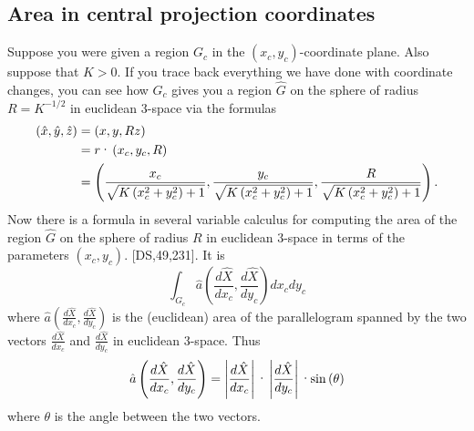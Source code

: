 \subsection*{Area in central projection coordinates}

Suppose you were given a region $G_{c}$ in the $\left(  x_{c},y_{c}\right)
$-coordinate plane. Also suppose that $K>0$. If you trace back everything we
have done with coordinate changes, you can see how $G_{c}$ gives you a region
$\hat{G}$ on the sphere of radius $R=K^{-1/2}$ in euclidean $3$-space via the
formulas%
\begin{align*}
\left(  \hat{x},\hat{y},\hat{z}\right)   &  =\left(  x,y,Rz\right) \\
&  =r\text{\textperiodcentered}\left(  x_{c},y_{c},R\right) \\
&  =\left(  \frac{x_{c}}{\sqrt{K\left(  x_{c}^{2}+y_{c}^{2}\right)  +1}}%
,\frac{y_{c}}{\sqrt{K\left(  x_{c}^{2}+y_{c}^{2}\right)  +1}},\frac{R}%
{\sqrt{K\left(  x_{c}^{2}+y_{c}^{2}\right)  +1}}\right)  .
\end{align*}
Now there is a formula in several variable calculus for computing the area of
the region $\hat{G}$ on the sphere of radius $R$ in euclidean $3$-space in
terms of the parameters $\left(  x_{c},y_{c}\right)  $. [DS,49,231]. It is
\begin{equation}%
{\displaystyle\int\nolimits_{G_{c}}}
\hat{a}\left(  \frac{d\hat{X}}{dx_{c}},\frac{d\hat{X}}{dy_{c}}\right)
dx_{c}dy_{c} \label{68}%
\end{equation}
where $\hat{a}\left(  \frac{d\hat{X}}{dx_{c}},\frac{d\hat{X}}{dy_{c}}\right)
$ is the (euclidean) area of the parallelogram spanned by the two vectors
$\frac{d\hat{X}}{dx_{c}}$ and $\frac{d\hat{X}}{dy_{c}}$ in euclidean
$3$-space. Thus%
\[
\hat{a}\left(  \frac{d\hat{X}}{dx_{c}},\frac{d\hat{X}}{dy_{c}}\right)
=\left\vert \frac{d\hat{X}}{dx_{c}}\right\vert \text{\textperiodcentered
}\left\vert \frac{d\hat{X}}{dy_{c}}\right\vert \text{\textperiodcentered
}\mathrm{sin}\left(  \theta\right)
\]
where $\theta$ is the angle between the two vectors.

